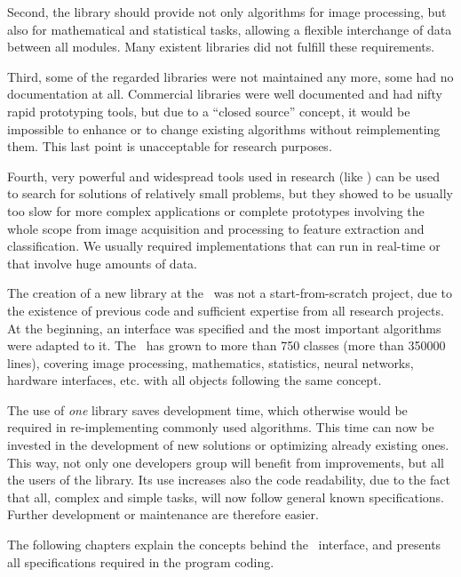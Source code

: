 Second, the library should provide not only algorithms for image processing,
but also for mathematical and statistical tasks, allowing a flexible
interchange of data between all modules.  Many existent libraries did not
fulfill these requirements.

Third, some of the regarded libraries were not maintained any more, some had
no documentation at all.  Commercial libraries were well documented and
had nifty rapid prototyping tools, but due to a ``closed source'' concept, it
would be impossible to enhance or to change existing algorithms without
reimplementing them.  This last point is unacceptable for research purposes.

Fourth, very powerful and widespread tools used in research (like
) can be used to search for solutions of relatively small
problems, but they showed to be usually too slow for more complex applications
or complete prototypes involving the whole scope from image acquisition and
processing to feature extraction and classification.  We usually required
implementations that can run in real-time or that involve huge amounts of
data.

The creation of a new library at the \lti\ was not a start-from-scratch
project, due to the existence of previous code and sufficient expertise from
all research projects.  At the beginning, an interface was specified and the
most important algorithms were adapted to it.  The \ltilib\ has grown to more
than 750 classes (more than 350000 lines), covering image processing,
mathematics, statistics, neural networks, hardware interfaces, etc. with all
objects following the same concept.

 The use of \emph{one} library saves development time, which
otherwise would be required in re-implementing commonly used algorithms.  This
time can now be invested in the development of new solutions or optimizing
already existing ones.  This way, not only one developers group will
benefit from improvements, but all the users of the library.
%
Its use increases also the code readability, due to the fact
that all, complex and simple tasks, will now follow general known
specifications.  Further development or maintenance are therefore easier.

The following chapters explain the concepts behind the \ltilib\ interface, and
presents all specifications required in the program coding.











